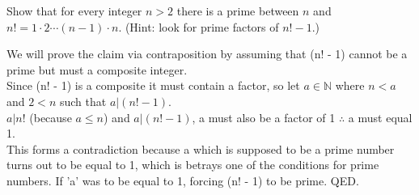 \documentclass[solution,letterpaper]{cs20}
\begin{document}


    \begin{problem}
        Show that for every integer $n>2$ there is a prime between $n$ and $n! = 1\cdot 2\cdots(n-1)\cdot n$. (Hint: look for prime factors of $n!-1$.)

        \begin{solution}
            We will prove the claim via contraposition by assuming that (n! - 1) cannot be a prime but must a composite integer. \\
            Since (n! - 1) is a composite it must contain a factor, so let $a \in \mathbb{N}$ where $n < a$ and $2 < n$ such that $a \vert (n! - 1)$. \\
            $a \vert n!$ (because  $a \leq n$) and $a \vert (n! - 1)$, a must also be a factor of 1 $\therefore$  a must equal 1. \\
            This forms a contradiction because a which is supposed to be a prime number turns out to be equal to 1, which is betrays one of the conditions for prime numbers. If 'a' was to be equal to 1, forcing (n! - 1) to be prime. QED.
        \end{solution}
    \end{problem}
    \newpage
\end{document}
